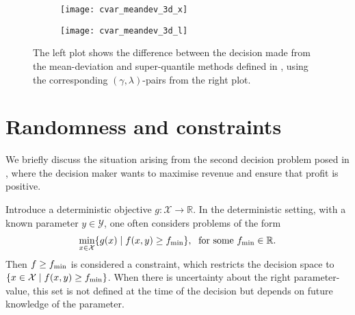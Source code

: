 \documentclass[main.tex]{subfiles}
\begin{document}
\begin{example}
  \begin{figure}[hbtp]
    \centering
    \begin{subfigure}[t]{.5\textwidth}
      \texttt{[image: cvar\_meandev\_3d\_x]}
    \end{subfigure}%
    \begin{subfigure}[t]{.5\textwidth}
      \texttt{[image: cvar\_meandev\_3d\_l]}
    \end{subfigure}
    \caption{The left plot shows the difference between the decision made
      from the mean-deviation and super-quantile methods defined in
      , using the corresponding
      $(\gamma,\lambda)$-pairs from the right plot.
    }\label{fig:cvar_meandev_2d}
  \end{figure}
\end{example}




\section{Randomness and
  constraints}\label{sec:one_randomness_constraints}
We briefly discuss the situation arising from the
second decision problem posed in ,
where the decision maker wants to maximise revenue and ensure that
profit is positive.

Introduce a deterministic objective $g:\mathcal{X}
\to\mathbb{R}$. In the deterministic setting, with a known parameter
$y\in\mathcal{Y}$, one often considers problems of the form
\begin{align}
  \min_{x\in\mathcal{X}}\{g(x)\mid f(x,y)\geq f_{\textnormal{min}} \},\;
  \text{ for some } f_{\textnormal{min}}\in\mathbb{R}.
\end{align}
Then $f\geq f_{\textnormal{min}}$ is considered a constraint, which restricts the
decision space to $\{x\in\mathcal{X}\mid f(x,y)\geq f_{\textnormal{min}}\}$.
When there is uncertainty about the right parameter-value, this set is
not defined at the time of the decision but depends on future knowledge
of the parameter.
\end{document}
